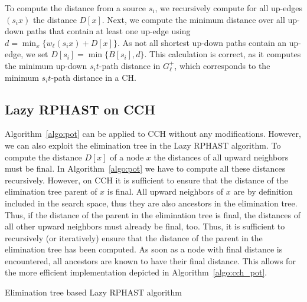 \documentclass[manuscript,review]{acmart}
\begin{document}
To compute the distance from a source $s_i$, we recursively compute for all up-edges $(s_i x)$ the distance $D[x]$.
Next, we compute the minimum distance over all up-down paths that contain at least one up-edge using $d = \min_x\{w_\ell(s_i x) + D[x]\}$.
As not all shortest up-down paths contain an up-edge, we set $D[s_i] = \min \{ B[s_i], d \}$.
This calculation is correct, as it computes the minimum up-down $s_it$-path distance in $G^+_\ell$, which corresponds to the minimum $s_it$-path distance in a CH.

\subsection{Lazy RPHAST on CCH}

Algorithm~\ref{algo:pot} can be applied to CCH without any modifications.
However, we can also exploit the elimination tree in the Lazy RPHAST algorithm.
To compute the distance $D[x]$ of a node $x$ the distances of all upward neighbors must be final.
In Algorithm~\ref{algo:pot} we have to compute all these distances recursively.
However, on CCH it is sufficient to ensure that the distance of the elimination tree parent of $x$ is final.
All upward neighbors of $x$ are by definition included in the search space, thus they are also ancestors in the elimination tree.
Thus, if the distance of the parent in the elimination tree is final, the distances of all other upward neighbors must already be final, too.
Thus, it is sufficient to recursively (or iteratively) ensure that the distance of the parent in the elimination tree has been computed.
As soon as a node with final distance is encountered, all ancestors are known to have their final distance.
This allows for the more efficient implementation depicted in Algorithm~\ref{algo:cch_pot}.

\begin{algorithm2e}
\caption{Elimination tree based Lazy RPHAST algorithm}
\label{algo:cch_pot}
\end{algorithm2e}
\end{document}
